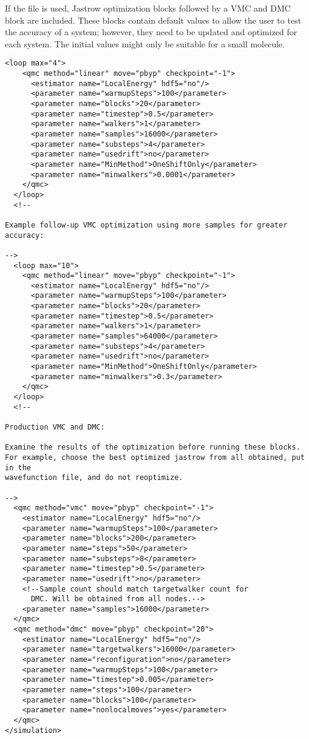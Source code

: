 \begin{itemize}
If the  file is used, Jastrow optimization
blocks followed by a VMC and DMC block are included. These blocks
contain default values to allow the user to test the accuracy of a
system; however, they need to be updated and optimized for each
system. The initial values might only be suitable for a small molecule.

\begin{lstlisting}[style=QMCPXML]
  <loop max="4">
    <qmc method="linear" move="pbyp" checkpoint="-1">
      <estimator name="LocalEnergy" hdf5="no"/>
      <parameter name="warmupSteps">100</parameter>
      <parameter name="blocks">20</parameter>
      <parameter name="timestep">0.5</parameter>
      <parameter name="walkers">1</parameter>
      <parameter name="samples">16000</parameter>
      <parameter name="substeps">4</parameter>
      <parameter name="usedrift">no</parameter>
      <parameter name="MinMethod">OneShiftOnly</parameter>
      <parameter name="minwalkers">0.0001</parameter>
    </qmc>
  </loop>
  <!--

Example follow-up VMC optimization using more samples for greater accuracy:

-->
  <loop max="10">
    <qmc method="linear" move="pbyp" checkpoint="-1">
      <estimator name="LocalEnergy" hdf5="no"/>
      <parameter name="warmupSteps">100</parameter>
      <parameter name="blocks">20</parameter>
      <parameter name="timestep">0.5</parameter>
      <parameter name="walkers">1</parameter>
      <parameter name="samples">64000</parameter>
      <parameter name="substeps">4</parameter>
      <parameter name="usedrift">no</parameter>
      <parameter name="MinMethod">OneShiftOnly</parameter>
      <parameter name="minwalkers">0.3</parameter>
    </qmc>
  </loop>
  <!--

Production VMC and DMC:

Examine the results of the optimization before running these blocks.
For example, choose the best optimized jastrow from all obtained, put in the 
wavefunction file, and do not reoptimize.

-->
  <qmc method="vmc" move="pbyp" checkpoint="-1">
    <estimator name="LocalEnergy" hdf5="no"/>
    <parameter name="warmupSteps">100</parameter>
    <parameter name="blocks">200</parameter>
    <parameter name="steps">50</parameter>
    <parameter name="substeps">8</parameter>
    <parameter name="timestep">0.5</parameter>
    <parameter name="usedrift">no</parameter>
    <!--Sample count should match targetwalker count for 
      DMC. Will be obtained from all nodes.-->
    <parameter name="samples">16000</parameter>
  </qmc>
  <qmc method="dmc" move="pbyp" checkpoint="20">
    <estimator name="LocalEnergy" hdf5="no"/>
    <parameter name="targetwalkers">16000</parameter>
    <parameter name="reconfiguration">no</parameter>
    <parameter name="warmupSteps">100</parameter>
    <parameter name="timestep">0.005</parameter>
    <parameter name="steps">100</parameter>
    <parameter name="blocks">100</parameter>
    <parameter name="nonlocalmoves">yes</parameter>
  </qmc>
</simulation>


\end{lstlisting}
\end{itemize}
